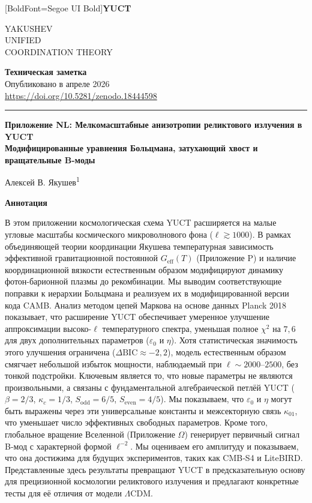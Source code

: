 \documentclass[11pt,a4paper]{article}
\newcommand{\makeheader}{%
	\noindent
	\begin{minipage}{0.17\textwidth}
		\raggedright
		{\fontspec{Segoe UI}[BoldFont=Segoe UI Bold]\bfseries\color{skyblue}\fontsize{46}{46}\selectfont YUCT}%
	\end{minipage}%
	\hspace{30pt}
	\begin{minipage}{0.32\textwidth}
		\raggedright
		{\sffamily\fontsize{11}{13}\selectfont YAKUSHEV\\ UNIFIED\\ COORDINATION THEORY}%
	\end{minipage}%
	\hfill
	\begin{minipage}{0.38\textwidth}
		\raggedleft
		{\sffamily\bfseries Техническая заметка}\\ 
		{\sffamily Опубликовано в апреле 2026}\\ 
		{\sffamily\footnotesize \url{https://doi.org/10.5281/zenodo.18444598}}%
	\end{minipage}
	\par\vspace{5pt}
	\noindent\textcolor{gold}{\rule{\textwidth}{1.6pt}}
	\par\vspace{0pt}
}
\begin{document}
	\thispagestyle{firstpage}
	\makeheader
	
	\vspace{0cm}
	{\LARGE\bfseries Приложение NL: Мелкомасштабные анизотропии реликтового излучения в YUCT \\ 
		\large Модифицированные уравнения Больцмана, затухающий хвост и вращательные B-моды \par}
	\vspace{0.2cm}
	
	{\large Алексей В. Якушев\textsuperscript{1}} \\
	\vspace{0.0cm}
	
	{\color{darkblue}\textbf{\LARGE Аннотация}} \par
	{\large
		\noindent
		В этом приложении космологическая схема YUCT расширяется на малые угловые масштабы космического микроволнового фона ($\ell \gtrsim 1000$). В рамках объединяющей теории координации Якушева температурная зависимость эффективной гравитационной постоянной $G_{\mathrm{eff}}(T)$ (Приложение P) и наличие координационной вязкости естественным образом модифицируют динамику фотон-барионной плазмы до рекомбинации. Мы выводим соответствующие поправки к иерархии Больцмана и реализуем их в модифицированной версии кода CAMB. Анализ методом цепей Маркова на основе данных Planck 2018 показывает, что расширение YUCT обеспечивает умеренное улучшение аппроксимации высоко-$\ell$ температурного спектра, уменьшая полное $\chi^2$ на $7,6$ для двух дополнительных параметров ($\varepsilon_0$ и $\eta$). Хотя статистическая значимость этого улучшения ограничена ($\Delta\mathrm{BIC} \approx -2,2$), модель естественным образом смягчает небольшой избыток мощности, наблюдаемый при $\ell \sim 2000$--$2500$, без тонкой подстройки. Ключевым является то, что новые параметры не являются произвольными, а связаны с фундаментальной алгебраической петлёй YUCT ($\beta=2/3$, $\kappa_c=1/3$, $S_{\mathrm{odd}}=6/5$, $S_{\mathrm{even}}=4/5$). Мы показываем, что $\varepsilon_0$ и $\eta$ могут быть выражены через эти универсальные константы и межсекторную связь $\kappa_{01}$, что уменьшает число эффективных свободных параметров. Кроме того, глобальное вращение Вселенной (Приложение $\Omega$) генерирует первичный сигнал B-мод с характерной формой $\ell^{-2}$. Мы оцениваем его амплитуду и показываем, что она достижима для будущих экспериментов, таких как CMB‑S4 и LiteBIRD. Представленные здесь результаты превращают YUCT в предсказательную основу для прецизионной космологии реликтового излучения и предлагают конкретные тесты для её отличия от модели $\Lambda$CDM.
	}
	
\end{document}

